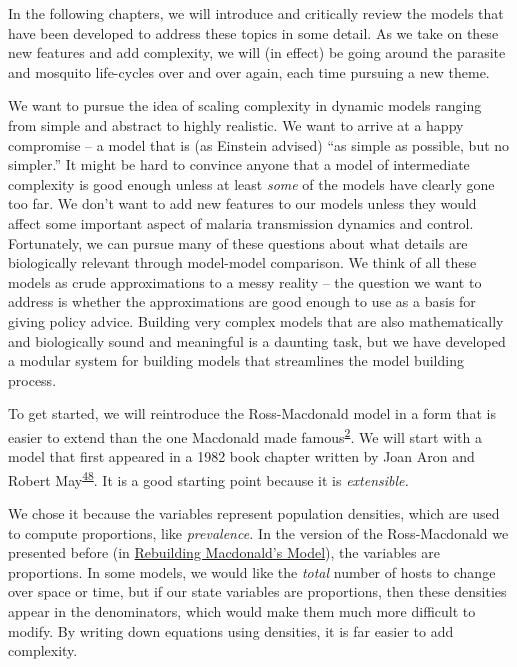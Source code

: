 \documentclass[
]{book}
\begin{document}
In the following chapters, we will introduce and critically review the models that have been developed to address these topics in some detail. As we take on these new features and add complexity, we will (in effect) be going around the parasite and mosquito life-cycles over and over again, each time pursuing a new theme.

We want to pursue the idea of scaling complexity in dynamic models ranging from simple and abstract to highly realistic. We want to arrive at a happy compromise -- a model that is (as Einstein advised) ``as simple as possible, but no simpler.'' It might be hard to convince anyone that a model of intermediate complexity is good enough unless at least \emph{some} of the models have clearly gone too far. We don't want to add new features to our models unless they would affect some important aspect of malaria transmission dynamics and control. Fortunately, we can pursue many of these questions about what details are biologically relevant through model-model comparison. We think of all these models as crude approximations to a messy reality -- the question we want to address is whether the approximations are good enough to use as a basis for giving policy advice. Building very complex models that are also mathematically and biologically sound and meaningful is a daunting task, but we have developed a modular system for building models that streamlines the model building process.

To get started, we will reintroduce the Ross-Macdonald model in a form that is easier to extend than the one Macdonald made famous\textsuperscript{\protect\hyperlink{ref-SmithDL2012_RossMacdonald}{2}}. We will start with a model that first appeared in a 1982 book chapter written by Joan Aron and Robert May\textsuperscript{\protect\hyperlink{ref-AronJL1982PopulationDynamics}{48}}. It is a good starting point because it is \emph{extensible.}

We chose it because the variables represent population densities, which are used to compute proportions, like \emph{prevalence.} In the version of the Ross-Macdonald we presented before (in \protect\hyperlink{rebuilding-macdonalds-model}{Rebuilding Macdonald's Model}), the variables are proportions. In some models, we would like the \emph{total} number of hosts to change over space or time, but if our state variables are proportions, then these densities appear in the denominators, which would make them much more difficult to modify. By writing down equations using densities, it is far easier to add complexity.
\end{document}
